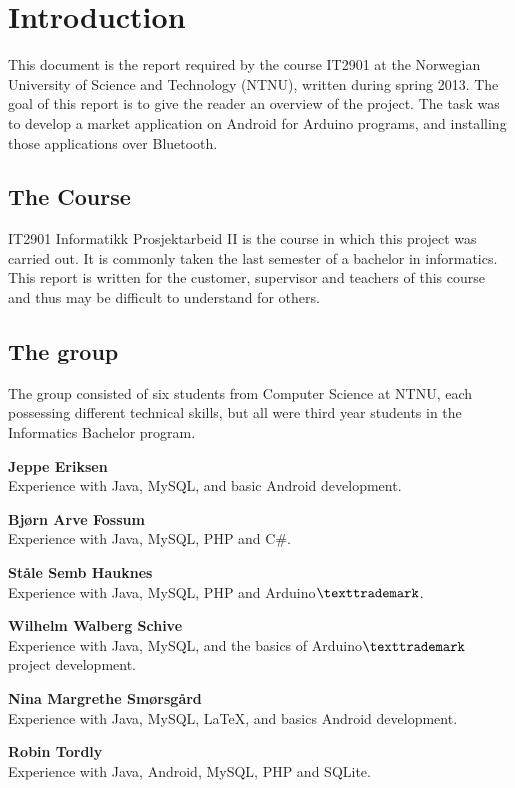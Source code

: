 \chapter{Introduction}

This document is the report required by the course IT2901 at the Norwegian University of Science and Technology (NTNU), written during spring 2013. The goal of this report is to give the reader an overview of the project.
The task was to develop a market application on Android for Arduino programs, and installing those applications over Bluetooth.

\section{The Course}
IT2901 Informatikk Prosjektarbeid II is the course in which this project was carried out. It is commonly taken the last semester of a bachelor in informatics. This report is written for the customer, supervisor and teachers of this course and thus may be difficult to understand for others.

\section{The group}
The group consisted of six students from Computer Science at NTNU, each possessing different technical skills, but all were third year students in the Informatics Bachelor program.

\begin{description}
	\item{\textbf{Jeppe Eriksen}}\hfill \\
		Experience with Java, MySQL, and basic Android development.
	\item{\textbf{Bjørn Arve Fossum}}\hfill \\
		Experience with Java, MySQL, PHP and C\#.
	\item{\textbf{Ståle Semb Hauknes}}\hfill \\
		Experience with Java, MySQL, PHP and Arduino$\texttrademark$.
	\item{\textbf{Wilhelm Walberg Schive}}\hfill \\
		Experience with Java, MySQL, and the basics of Arduino$\texttrademark$ project development.
	\item{\textbf{Nina Margrethe Smørsgård}}\hfill \\
		Experience with Java, MySQL, \LaTeX, and basics Android development.
	\item{\textbf{Robin Tordly}}\hfill \\
		Experience with Java, Android, MySQL, PHP and SQLite.
\end{description}

